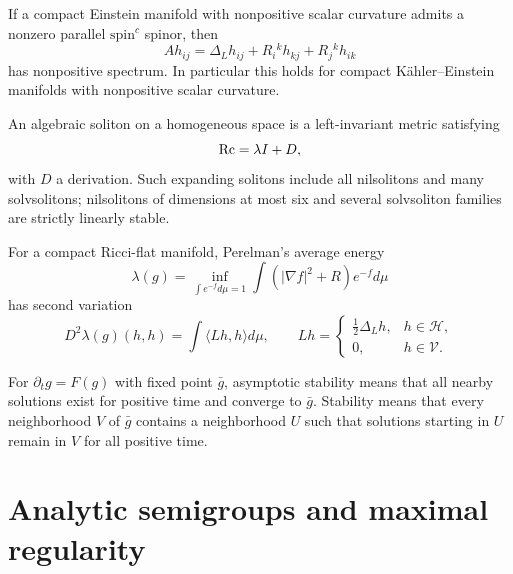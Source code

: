 \begin{theorem}
\label{thm:chow-iv-spinc-linear-stability}
If a compact Einstein manifold with nonpositive scalar curvature admits a
nonzero parallel $\mathrm{spin}^c$ spinor, then
\[
 Ah_{ij}=\Delta_Lh_{ij}+R_i{}^kh_{kj}+R_j{}^kh_{ik}
\]
has nonpositive spectrum.  In particular this holds for compact
K\"ahler--Einstein manifolds with nonpositive scalar curvature.
\end{theorem}

An algebraic soliton on a homogeneous space is a left-invariant metric satisfying
\[
 \operatorname{Rc}=\lambda I+D,
\]
with $D$ a derivation.  Such expanding solitons include all nilsolitons and
many solvsolitons; nilsolitons of dimensions at most six and several
solvsoliton families are strictly linearly stable.

\begin{proposition}
\label{prop:chow-iv-perelman-lambda-second-variation}
For a compact Ricci-flat manifold, Perelman's average energy
\[
 \lambda(g)=\inf_{\int e^{-f}d\mu=1}\int(|\nabla f|^2+R)e^{-f}d\mu
 \tag{35.8}
\]
has second variation
\[
 D^2\lambda(g)(h,h)=\int\langle Lh,h\rangle d\mu,
 \qquad
 Lh=\begin{cases}\frac12\Delta_Lh,&h\in\mathcal H,\\0,&h\in\mathcal V.
 \end{cases}
\]
\end{proposition}

\begin{definition}
\label{def:chow-iv-dynamic-stability}
For $\partial_tg=F(g)$ with fixed point $\bar g$, asymptotic stability means
that all nearby solutions exist for positive time and converge to $\bar g$.
Stability means that every neighborhood $V$ of $\bar g$ contains a neighborhood
$U$ such that solutions starting in $U$ remain in $V$ for all positive time.
\end{definition}

\section{Analytic semigroups and maximal regularity}

